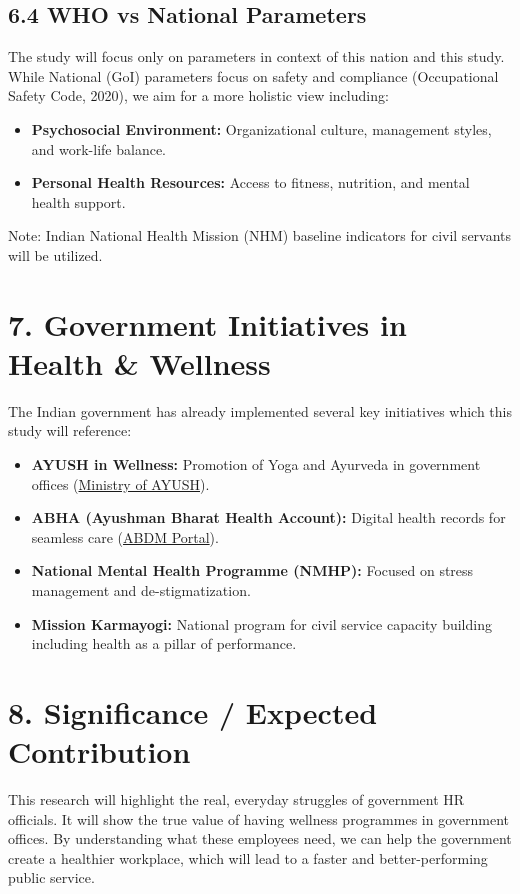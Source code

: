 \documentclass[11pt,a4paper]{article}
\begin{document}
\subsection{6.4 WHO vs National Parameters}
The study will focus only on parameters in context of this nation and this study. While National (GoI) parameters focus on safety and compliance (Occupational Safety Code, 2020), we aim for a more holistic view including:
\begin{itemize}
    \item \textbf{Psychosocial Environment:} Organizational culture, management styles, and work-life balance.
    \item \textbf{Personal Health Resources:} Access to fitness, nutrition, and mental health support.
\end{itemize}
Note: Indian National Health Mission (NHM) baseline indicators for civil servants will be utilized.

\section{7. Government Initiatives in Health \& Wellness}
\vspace{0.2cm}
The Indian government has already implemented several key initiatives which this study will reference:
\begin{itemize}
    \item \textbf{AYUSH in Wellness:} Promotion of Yoga and Ayurveda in government offices (\href{https://ayush.gov.in/}{Ministry of AYUSH}).
    \item \textbf{ABHA (Ayushman Bharat Health Account):} Digital health records for seamless care (\href{https://abdm.gov.in/}{ABDM Portal}).
    \item \textbf{National Mental Health Programme (NMHP):} Focused on stress management and de-stigmatization.
    \item \textbf{Mission Karmayogi:} National program for civil service capacity building including health as a pillar of performance.
\end{itemize}

\section{8. Significance / Expected Contribution}
\vspace{0.2cm}
\begin{goldbox}
This research will highlight the real, everyday struggles of government HR officials. It will show the true value of having wellness programmes in government offices. By understanding what these employees need, we can help the government create a healthier workplace, which will lead to a faster and better-performing public service.
\end{goldbox}
\end{document}
